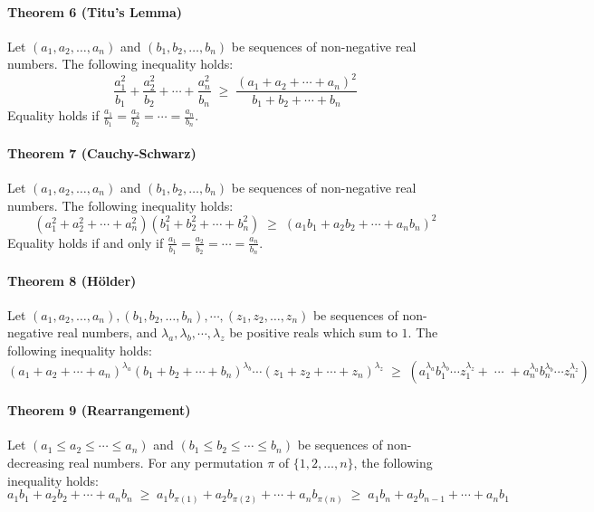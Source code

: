 \documentclass[11pt, reqno]{article}
\begin{document}
\begin{em}
\paragraph{Theorem 6 (Titu's Lemma)}
Let $(a_1, a_2, \dots, a_n)$ and $(b_1, b_2, \dots, b_n)$ be sequences of non-negative real numbers. The following inequality holds:
\begin{equation*}
	\dfrac{a_1^2}{b_1} + \dfrac{a_2^2}{b_2} + \cdots + \dfrac{a_n^2}{b_n}	\;\geq\;		\dfrac{(a_1 + a_2 + \cdots + a_n)^2}{b_1 + b_2 + \cdots + b_n}
\end{equation*}
Equality holds if $\frac{a_1}{b_1} = \frac{a_2}{b_2} = \cdots = \frac{a_n}{b_n}$.

\paragraph{Theorem 7 (Cauchy-Schwarz)}
Let $(a_1, a_2, \dots, a_n)$ and $(b_1, b_2, \dots, b_n)$ be sequences of non-negative real numbers. The following inequality holds:
\begin{equation*}
	(a_1^2 + a_2^2 + \cdots + a_n^2)(b_1^2 + b_2^2 + \cdots + b_n^2)	\;\geq\;		(a_1b_1 + a_2b_2 + \cdots + a_nb_n)^2
\end{equation*}
Equality holds if and only if $\frac{a_1}{b_1} = \frac{a_2}{b_2} = \cdots = \frac{a_n}{b_n}$.

\paragraph{Theorem 8 (H\"{o}lder)}
Let $(a_1, a_2, \dots, a_n),(b_1, b_2, \dots, b_n),\cdots,(z_1, z_2, \dots, z_n)$ be sequences of non-negative real numbers,
and $\lambda_a, \lambda_b, \cdots, \lambda_z$ be positive reals which sum to $1$. The following inequality holds:
\begin{equation*}
	(a_1 + a_2 + \cdots + a_n)^{\lambda_a} (b_1 + b_2 + \cdots + b_n)^{\lambda_b} \cdots (z_1 + z_2 + \cdots + z_n)^{\lambda_z}	\;\geq\;
	(a_1^{\lambda_a} b_1^{\lambda_b} \!\cdots\! z_1^{\lambda_z} + \;\cdots\; + a_n^{\lambda_a} b_n^{\lambda_b} \!\cdots\! z_n^{\lambda_z})
\end{equation*}

\paragraph{Theorem 9 (Rearrangement)}
Let $(a_1 \leq a_2 \leq \cdots \leq a_n)$ and $(b_1 \leq b_2 \leq \cdots \leq b_n)$ be sequences of non-decreasing real numbers.
For any permutation $\pi$ of $\{1, 2, \dots, n\}$, the following inequality holds:
\begin{equation*}
	a_1b_1 + a_2b_2 + \cdots + a_nb_n	\;\geq\;		a_1b_{\pi(1)} + a_2b_{\pi(2)} + \cdots + a_nb_{\pi(n)}	\;\geq\;
	a_1b_n + a_2b_{n-1} + \cdots + a_nb_1
\end{equation*}


\end{em}
\end{document}
